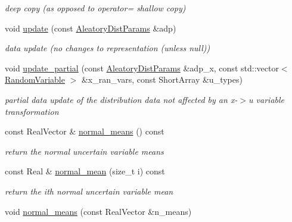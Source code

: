 \begin{DoxyCompactItemize}
\begin{DoxyCompactList}\small\item\em deep copy (as opposed to operator= shallow copy) \end{DoxyCompactList}\item 
void \hyperlink{classPecos_1_1AleatoryDistParams_a6a3e1b17a689ae68cd7dbf22fbf8952a}{update} (const \hyperlink{classPecos_1_1AleatoryDistParams}{Aleatory\+Dist\+Params} \&adp)\label{classPecos_1_1AleatoryDistParams_a6a3e1b17a689ae68cd7dbf22fbf8952a}

\begin{DoxyCompactList}\small\item\em data update (no changes to representation (unless null)) \end{DoxyCompactList}\item 
void \hyperlink{classPecos_1_1AleatoryDistParams_aae4cfc7407aafe0ac18ef04cff2e1451}{update\+\_\+partial} (const \hyperlink{classPecos_1_1AleatoryDistParams}{Aleatory\+Dist\+Params} \&adp\+\_\+x, const std\+::vector$<$ \hyperlink{classPecos_1_1RandomVariable}{Random\+Variable} $>$ \&x\+\_\+ran\+\_\+vars, const Short\+Array \&u\+\_\+types)\label{classPecos_1_1AleatoryDistParams_aae4cfc7407aafe0ac18ef04cff2e1451}

\begin{DoxyCompactList}\small\item\em partial data update of the distribution data not affected by an x-\/$>$u variable transformation \end{DoxyCompactList}\item 
const Real\+Vector \& \hyperlink{classPecos_1_1AleatoryDistParams_abac7238285481f8e088b46c370ab998d}{normal\+\_\+means} () const \label{classPecos_1_1AleatoryDistParams_abac7238285481f8e088b46c370ab998d}

\begin{DoxyCompactList}\small\item\em return the normal uncertain variable means \end{DoxyCompactList}\item 
const Real \& \hyperlink{classPecos_1_1AleatoryDistParams_a701c46486c2aa77276036b48d5608ea0}{normal\+\_\+mean} (size\+\_\+t i) const \label{classPecos_1_1AleatoryDistParams_a701c46486c2aa77276036b48d5608ea0}

\begin{DoxyCompactList}\small\item\em return the ith normal uncertain variable mean \end{DoxyCompactList}\item 
void \hyperlink{classPecos_1_1AleatoryDistParams_aab7d3d1757077e365c03116df9972e49}{normal\+\_\+means} (const Real\+Vector \&n\+\_\+means)\label{classPecos_1_1AleatoryDistParams_aab7d3d1757077e365c03116df9972e49}


\end{DoxyCompactItemize}
